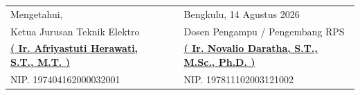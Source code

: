 \documentclass[9.5pt,a4paper]{article}
\begin{document}
\vspace{0.8cm}

\begin{table}[h!]
\centering
\begin{tabular}{C{7.5cm}C{1cm}C{7.5cm}}
Mengetahui, & & Bengkulu, 14 Agustus 2026 \\
Ketua Jurusan Teknik Elektro & & Dosen Pengampu / Pengembang RPS \\[1.8cm]
\textbf{\underline{( Ir. Afriyastuti Herawati, S.T., M.T. )}} & & \textbf{\underline{( Ir. Novalio Daratha, S.T., M.Sc., Ph.D. )}} \\
NIP. 197404162000032001 & & NIP. 197811102003121002
\end{tabular}
\end{table}
\end{document}
